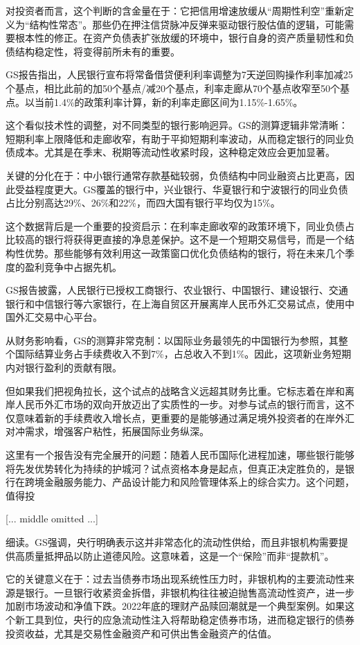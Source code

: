 \documentclass[11pt]{ctexart}
\begin{document}
对投资者而言，这个判断的含金量在于：它把信用增速放缓从“周期性利空”重新定义为“结构性常态”。那些仍在押注信贷脉冲反弹来驱动银行股估值的逻辑，可能需要根本性的修正。在资产负债表扩张放缓的环境中，银行自身的资产质量韧性和负债结构稳定性，将变得前所未有的重要。

GS报告指出，人民银行宣布将常备借贷便利利率调整为7天逆回购操作利率加减25个基点，相比此前的加50个基点/减20个基点，利率走廊从70个基点收窄至50个基点。以当前1.4\%的政策利率计算，新的利率走廊区间为1.15\%-1.65\%。

这个看似技术性的调整，对不同类型的银行影响迥异。GS的测算逻辑非常清晰：短期利率上限降低和走廊收窄，有助于平抑短期利率波动，从而稳定银行的同业负债成本。尤其是在季末、税期等流动性收紧时段，这种稳定效应会更加显著。

关键的分化在于：中小银行通常存款基础较弱，负债结构中同业融资占比更高，因此受益程度更大。GS覆盖的银行中，兴业银行、华夏银行和宁波银行的同业负债占比分别高达29\%、26\%和22\%，而四大国有银行平均仅为15\%。

这个数据背后是一个重要的投资启示：在利率走廊收窄的政策环境下，同业负债占比较高的银行将获得更直接的净息差保护。这不是一个短期交易信号，而是一个结构性优势。那些能够有效利用这一政策窗口优化负债结构的银行，将在未来几个季度的盈利竞争中占据先机。

GS报告披露，人民银行已授权工商银行、农业银行、中国银行、建设银行、交通银行和中信银行等六家银行，在上海自贸区开展离岸人民币外汇交易试点，使用中国外汇交易中心平台。

从财务影响看，GS的测算非常克制：以国际业务最领先的中国银行为参照，其整个国际结算业务占手续费收入不到7\%，占总收入不到1\%。因此，这项新业务短期内对银行盈利的贡献有限。

但如果我们把视角拉长，这个试点的战略含义远超其财务比重。它标志着在岸和离岸人民币外汇市场的双向开放迈出了实质性的一步。对参与试点的银行而言，这不仅意味着新的手续费收入增长点，更重要的是能够通过满足境外投资者的在岸外汇对冲需求，增强客户粘性，拓展国际业务纵深。

这里有一个报告没有完全展开的问题：随着人民币国际化进程加速，哪些银行能够将先发优势转化为持续的护城河？试点资格本身是起点，但真正决定胜负的，是银行在跨境金融服务能力、产品设计能力和风险管理体系上的综合实力。这个问题，值得投

[... middle omitted ...]

细读。GS强调，央行明确表示这并非常态化的流动性供给，而且非银机构需要提供高质量抵押品以防止道德风险。这意味着，这是一个“保险”而非“提款机”。

它的关键意义在于：过去当债券市场出现系统性压力时，非银机构的主要流动性来源是银行。一旦银行收紧资金拆借，非银机构往往被迫抛售高流动性资产，进一步加剧市场波动和净值下跌。2022年底的理财产品赎回潮就是一个典型案例。如果这个新工具到位，央行的应急流动性注入将帮助稳定债券市场，进而稳定银行的债券投资收益，尤其是交易性金融资产和可供出售金融资产的估值。
\end{document}
